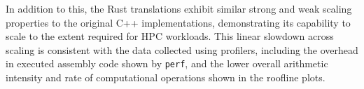 In addition to this, the Rust translations exhibit similar strong and weak scaling properties to the original C++ implementations, demonstrating its capability to scale to the extent required for \acrshort{HPC} workloads. This linear slowdown across scaling is consistent with the data collected using profilers, including the overhead in executed assembly code shown by \texttt{perf}, and the lower overall arithmetic intensity and rate of computational operations shown in the roofline plots.

